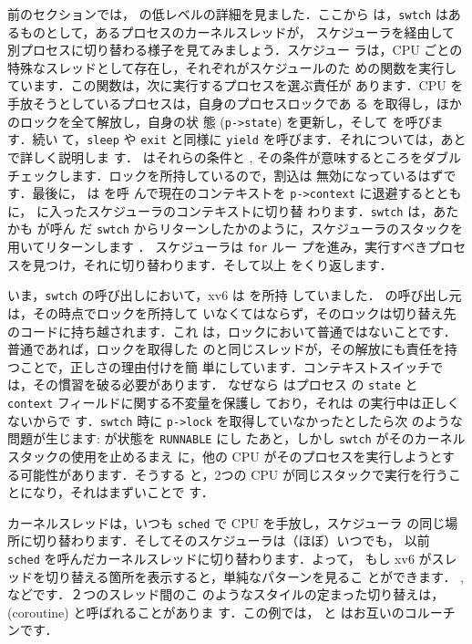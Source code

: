 前のセクションでは， の低レベルの詳細を見ました．ここから
は，\lstinline{swtch} はあるものとして，あるプロセスのカーネルスレッドが，
スケジューラを経由して別プロセスに切り替わる様子を見てみましょう．スケジュー
ラは，CPU ごとの特殊なスレッドとして存在し，それぞれがスケジュールのた
めの関数を実行しています．この関数は，次に実行するプロセスを選ぶ責任が
あります．CPU を手放そうとしているプロセスは，自身のプロセスロックであ
る  を取得し，ほかのロックを全て解放し，自身の状
態 (\lstinline{p->state}) を更新し，そして  を呼びます．続い
て，\lstinline{sleep} や \lstinline{exit} と同様に \lstinline{yield}
を呼びます．それについては，あとで詳しく説明しま
す． はそれらの条件と , 
その条件が意味するところをダブルチェックします．ロックを所持しているので，割込は
無効になっているはずです．最後に， は  を呼
んで現在のコンテキストを \lstinline{p->context} に退避するととも
に， に入ったスケジューラのコンテキストに切り替
わります．\lstinline{swtch} は，あたかも が呼ん
だ \lstinline{swtch} からリターンしたかのように，スケジューラのスタックを
用いてリターンします
．
スケジューラは \lstinline{for} ルー
プを進み，実行すべきプロセスを見つけ，それに切り替わります．そして以上
をくり返します．

いま，\lstinline{swtch} の呼び出しにおいて，xv6 は  を所持
していました． の呼び出し元は，その時点でロックを所持して
いなくてはならず，そのロックは切り替え先のコードに持ち越されます．これ
は，ロックにおいて普通ではないことです．普通であれば，ロックを取得した
のと同じスレッドが，その解放にも責任を持つことで，正しさの理由付けを簡
単にしています．コンテキストスイッチでは，その慣習を破る必要があります．
なぜなら  はプロセス
の \lstinline{state} と \lstinline{context} フィールドに関する不変量を保護し
ており，それは  の実行中は正しくないからで
す．\lstinline{swtch} 時に \lstinline{p->lock} を取得していなかったとしたら次
のような問題が生じます:  が状態を \lstinline{RUNNABLE} にし
たあと，しかし \lstinline{swtch} がそのカーネルスタックの使用を止めるまえ
に，他の CPU がそのプロセスを実行しようとする可能性があります．そうする
と，2つの CPU が同じスタックで実行を行うことになり，それはまずいことで
す．

カーネルスレッドは，いつも \lstinline{sched} で CPU を手放し，スケジューラ
の同じ場所に切り替わります．そしてそのスケジューラは（ほぼ）いつでも，
以前 \lstinline{sched} を呼んだカーネルスレッドに切り替わります．よって，
もし xv6 がスレッドを切り替える箇所を表示すると，単純なパターンを見るこ
とができます．
,
 などです．２つのスレッド間のこ
のようなスタイルの定まった切り替えは， (coroutine) と呼ばれることがありま
す．この例では， と  はお互いのコルーチンです．

